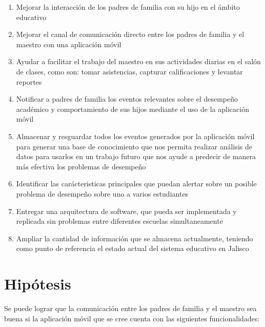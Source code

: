             \begin{enumerate}
                \item Mejorar la interacción de los padres de familia con su hijo en el ámbito educativo
                
                \item Mejorar el canal de comunicación directo entre los padres de familia y el maestro con una aplicación móvil
                
                \item Ayudar a facilitar el trabajo del maestro en sus actividades diarias en el salón de clases, como son: tomar asistencias, capturar calificaciones y levantar reportes
                
                \item Notificar a padres de familia los eventos relevantes sobre el desempeño académico y comportamiento de sus hijos mediante el uso de la aplicación móvil
                
                \item Almacenar y resguardar todos los eventos generados por la aplicación móvil para generar una base de conocimiento que nos permita realizar análisis de datos para usarlos en un trabajo futuro que nos ayude a predecir de manera más efectiva los problemas de desempeño
                
                \item Identificar las carácteristicas principales que puedan alertar sobre un posible problema de desempeño sobre uno a varios estudiantes
                
                \item Entregar una arquitectura de software, que pueda ser implementada y replicada sin problemas entre diferentes escuelas simultaneamente
                
                \item Ampliar la cantidad de información que se almacena actualmente, teniendo como punto de referencia el estado actual del sistema educativo en Jalisco

            \end{enumerate}


    \section{Hipótesis} \label{hipotesis}

        Se puede lograr que la comunicación entre los padres de familia y el maestro sea buena si la aplicación móvil que se cree cuenta con las siguientes funcionalidades:


